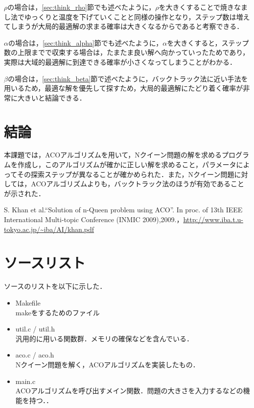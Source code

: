 \documentclass{jarticle}
\begin{document}
$\rho$の場合は，\ref{sec:think_rho}節でも述べたように，$\rho$を大きくすることで焼きなまし法でゆっくりと温度を下げていくことと同様の操作となり，ステップ数は増えてしまうが大局的最適解の求まる確率は大きくなるからであると考察できる．

$\alpha$の場合は，\ref{sec:think_alpha}節でも述べたように，$\alpha$を大きくすると，ステップ数の上限までで収束する場合は，たまたま良い解へ向かっていったためであり，実際は大域的最適解に到達できる確率が小さくなってしまうことがわかる．

$\beta$の場合は，\ref{sec:think_beta}節で述べたように，バックトラック法に近い手法を用いるため，最適な解を優先して探すため，大局的最適解にたどり着く確率が非常に大きいと結論できる．


\section{結論}
本課題では，ACOアルゴリズムを用いて，Nクイーン問題の解を求めるプログラムを作成し，このアルゴリズムが確かに正しい解を求めること，パラメータによってその探索ステップが異なることが確かめられた．また，Nクイーン問題に対しては，ACOアルゴリズムよりも，バックトラック法のほうが有効であることが示された．




\begin{thebibliography}{n}
S. Khan et al.“Solution of n-Queen problem using ACO”. In proc. of 13th IEEE International Multi-topic Conference (INMIC 2009),2009.，\url{http://www.iba.t.u-tokyo.ac.jp/~iba/AI/khan.pdf}


\end{thebibliography}


\appendix
\section{ソースリスト}

ソースのリストを以下に示した．

\begin{itemize}
	\item Makefile \\
		makeをするためのファイル
	\item util.c / util.h \\
		汎用的に用いる関数群．メモリの確保などを含んでいる．
	\item aco.c / aco.h \\
		Nクイーン問題を解く，ACOアルゴリズムを実装したもの．
	\item main.c \\
		ACOアルゴリズムを呼び出すメイン関数．問題の大きさを入力するなどの機能を持つ．．
\end{itemize}
\end{document}
